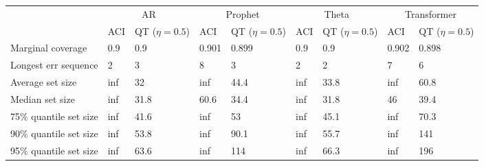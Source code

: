 \begin{tabular}{lllllllll}
\toprule
& \multicolumn{2}{c}{AR}& \multicolumn{2}{c}{Prophet}& \multicolumn{2}{c}{Theta}& \multicolumn{2}{c}{Transformer} \\
& ACI & QT ($\eta=0.5$) & ACI & QT ($\eta=0.5$) & ACI & QT ($\eta=0.5$) & ACI & QT ($\eta=0.5$) \\
\midrule
Marginal coverage & 0.9 & 0.9 & 0.901 & 0.899 & 0.9 & 0.9 & 0.902 & 0.898 \\
Longest err sequence & 2 & 3 & 8 & 3 & 2 & 2 & 7 & 6 \\
Average set size & inf & 32 & inf & 44.4 & inf & 33.8 & inf & 60.8 \\
Median set size & inf & 31.8 & 60.6 & 34.4 & inf & 31.8 & 46 & 39.4 \\
75\% quantile set size & inf & 41.6 & inf & 53 & inf & 45.1 & inf & 70.3 \\
90\% quantile set size & inf & 53.8 & inf & 90.1 & inf & 55.7 & inf & 141 \\
95\% quantile set size & inf & 63.6 & inf & 114 & inf & 66.3 & inf & 196 \\
\bottomrule
\end{tabular}
